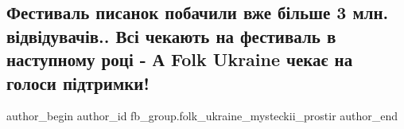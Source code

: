  
 
 
 
 

\subsection{Фестиваль писанок побачили вже більше 3 млн. відвідувачів.. Всі чекають на фестиваль в наступному році - А Folk Ukraine чекає на голоси підтримки!}
\label{sec:17_06_2018.fb.fb_group.folk_ukraine_mysteckii_prostir.1.festival_pysanky_kyiv_pidtrymka_folk_ukraine}

\ifcmt
 author_begin
   author_id fb_group.folk_ukraine_mysteckii_prostir
 author_end
\fi
